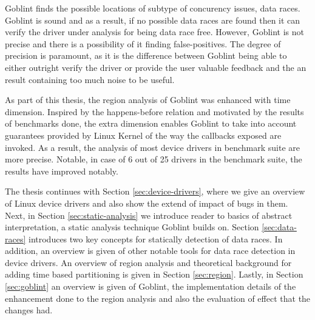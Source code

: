 \documentclass[..thesis.tex]{subfiles}
\begin{document}
Goblint finds the possible locations of subtype of concurency issues, data races. Goblint is sound and as a result, if no possible data races are found then it can verify the driver under analysis for being data race free. However, Goblint is not precise and there is a possibility of it finding false-positives. The degree of precision is paramount, as it is the difference between Goblint being able to either outright verify the driver or provide the user valuable feedback and the an result containing too much noise to be useful.
  

As part of this thesis, the region analysis of Goblint was enhanced with time dimension. Inspired by the happens-before relation and motivated by the results of benchmarks done, the extra dimension enables Goblint to take into account guarantees provided by Linux Kernel of the way the callbacks exposed are invoked. As a result, the analysis of most device drivers in benchmark suite are more precise. Notable, in case of 6 out of 25 drivers in the benchmark suite, the results have improved notably.


The thesis continues with Section \ref{sec:device-drivers}, where we give an overview of Linux device drivers and also show the extend of impact of bugs in them. Next, in Section \ref{sec:static-analysis} we introduce reader to basics of abstract interpretation, a static analysis technique Goblint builds on. Section \ref{sec:data-races} introduces two key concepts for statically detection of data races. In addition, an overview is given of other notable tools for data race detection in device drivers. An overview of region analysis and theoretical background for adding time based partitioning is given in Section \ref{sec:region}. Lastly, in Section \ref{sec:goblint} an overview is given of Goblint, the implementation details of the enhancement done to the region analysis and also the evaluation of effect that the changes had.  
\end{document}
